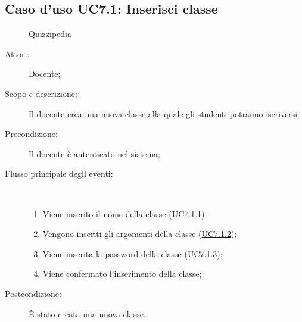 \subsection{Caso d'uso UC7.1: Inserisci classe}
	\begin{figure}[H]
		\centering
		\begin{resizedtikzpicture}{\textwidth}
		\begin{umlsystem}[x=0, fill=lightgray!20]{Quizzipedia}
		\end{umlsystem}
		\end{resizedtikzpicture}
		\caption{}
	\end{figure}
\begin{description}
\item[Attori:] Docente;
\item[Scopo e descrizione:] Il docente crea una nuova classe alla quale gli studenti potranno iscriversi 
      \item[Precondizione:] Il docente è autenticato nel sistema;

        \item[Flusso principale degli eventi:] \ 
 \begin{enumerate}
          \item Viene inserito il nome della classe (\hyperlink{UC7.1.1}{UC7.1.1});
          \item Vengono inseriti gli argomenti della classe (\hyperlink{UC7.1.2}{UC7.1.2});
          \item Viene inserita la password della classe (\hyperlink{UC7.1.3}{UC7.1.3});
          \item Viene confermato l'inserimento della classe;

      \end{enumerate}
    \item[Postcondizione:] È stato creata una nuova classe.
  \end{description}
\hypertarget{UC7.1.1}{}
